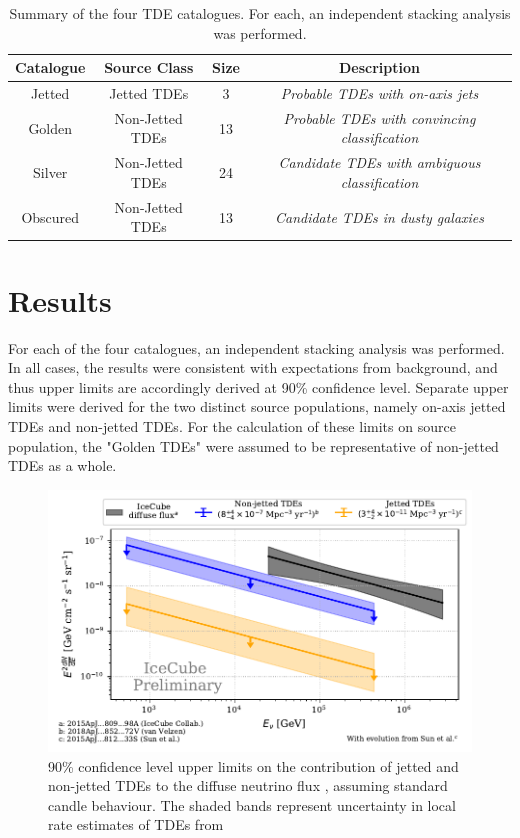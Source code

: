 \documentclass{PoS}
\begin{document}
\begin{table}[]
    \centering
     \begin{tabular}{||c c c c||} 
     \hline
     Catalogue & Source Class & Size & Description \\ [0.5ex] 
     \hline\hline
     Jetted & Jetted TDEs &  3 & \textit{Probable TDEs with on-axis jets}\\ 
     \hline
     Golden & Non-Jetted TDEs & 13 & \textit{Probable TDEs with convincing classification}\\
     \hline
     Silver & Non-Jetted TDEs & 24 & \textit{Candidate TDEs with ambiguous classification}\\
     \hline
     Obscured & Non-Jetted TDEs & 13 & \textit{Candidate TDEs in dusty galaxies}\\[1ex] 
     \hline
     \end{tabular}
    \caption{Summary of the four TDE catalogues. For each, an independent stacking analysis was performed.}
    \label{tab:my_label}
\end{table}{}



\section{Results}

For each of the four catalogues, an independent stacking analysis was performed. In all cases, the results were consistent with expectations from background, and thus upper limits are accordingly derived at 90\% confidence level. Separate upper limits were derived for the two distinct source populations, namely on-axis jetted TDEs and non-jetted TDEs. For the calculation of these limits on source population, the "Golden TDEs" were assumed to be representative of non-jetted TDEs as a whole. 

\begin{figure}[!ht]
	\centering \includegraphics[width=\textwidth]{figures/diffuse_flux_global_fit}
	\caption{90\% confidence level upper limits on the contribution of jetted and non-jetted TDEs to the diffuse neutrino flux \cite{Aartsen:2015knd}, assuming standard candle behaviour. The shaded bands represent uncertainty in local rate estimates of TDEs from \cite{vanVelzen:2017qum, Sun:2015bda}}
	\label{fig:DiffuseFlux}
\end{figure}
\end{document}

